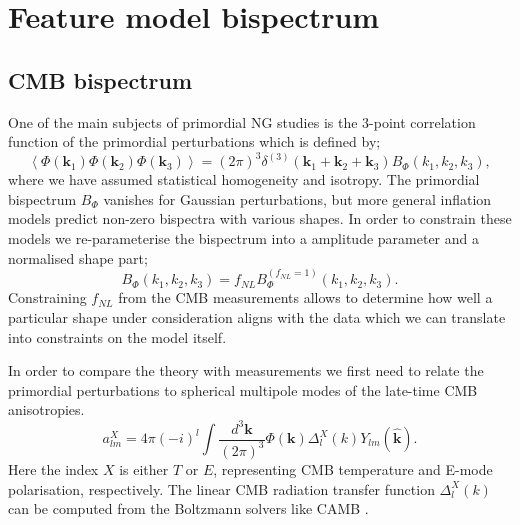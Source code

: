 \section{Feature model bispectrum} \label{section: feature model bispectrum}
\subsection{CMB bispectrum}

One of the main subjects of primordial NG studies is the 3-point correlation function of the primordial perturbations which is defined by;
\begin{equation}
	\left< \Phi(\mathbf{k}_1) \Phi(\mathbf{k}_2) \Phi(\mathbf{k}_3) \right> = (2\pi)^3 \delta^{(3)}(\mathbf{k}_1 + \mathbf{k}_2 + \mathbf{k}_3) B_\Phi (k_1, k_2, k_3),
\end{equation}
where we have assumed statistical homogeneity and isotropy. The primordial bispectrum $B_\Phi$ vanishes for Gaussian perturbations, but more general inflation models predict non-zero bispectra with various shapes.  In order to constrain these models we re-parameterise the bispectrum into a amplitude parameter and a normalised shape part;
\begin{equation}
	B_\Phi (k_1, k_2, k_3) = f_{NL} B_\Phi^{(f_{NL}=1)} (k_1, k_2, k_3).
	\label{fNL definition}
\end{equation}
Constraining $f_{NL}$ from the CMB measurements allows to determine how well a particular shape under consideration aligns with the data which we can translate into constraints on the model itself.

In order to compare the theory with measurements we first need to relate the primordial perturbations to spherical multipole modes of the late-time CMB anisotropies.
\begin{equation}
	a_{lm}^{X} = 4\pi(-i)^l \int \frac{d^3\mathbf{k}}{(2\pi)^3}  \Phi(\mathbf{k}) \Delta_l^X(k) Y_{lm}(\hat{\mathbf{k}}).
	\label{theoretical multiple moments}
\end{equation}
Here the index $X$ is either $T$ or $E$, representing CMB temperature and E-mode polarisation, respectively. The linear CMB radiation transfer function $\Delta_l^X(k)$ can be computed from the Boltzmann solvers like CAMB \cite{Lewis2000}.

